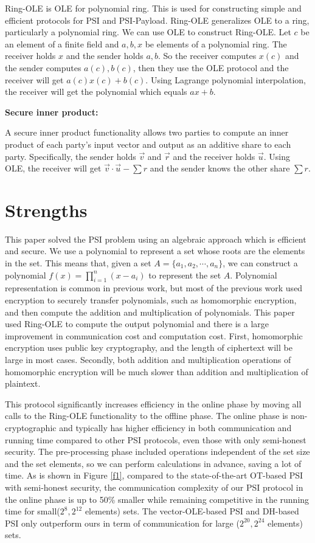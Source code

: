 \documentclass{source/Paper}
\begin{document}
    Ring-OLE is OLE for polynomial ring.
    This is used for constructing simple and efficient protocols for PSI and PSI-Payload. Ring-OLE generalizes OLE to a ring, particularly a polynomial ring. We can use OLE to construct Ring-OLE. Let $c$ be an element of a finite field and $a,b,x$ be elements of a polynomial ring.
    The receiver holds $x$ and the sender holds $a,b$. So the receiver computes $x(c)$ and the sender computes $a(c),b(c)$, then they use the OLE protocol and the receiver will get $a(c)x(c)+b(c)$. Using Lagrange polynomial interpolation, the receiver will get the polynomial which equals $ax+b$.

    \textbf{Secure inner product:}

    A secure inner product functionality allows two parties to compute an inner product of each party's input vector and output as an additive share to each party. Specifically, the sender holds $\vec{v}$ and $\vec{r}$ and the receiver holds $\vec{u}$. Using OLE, the receiver will get $\vec{v}\cdot \vec{u} - \sum r$ and the sender knows the other share $ \sum r$.



    \section{Strengths}

    This paper solved the PSI problem using an algebraic approach which is efficient and secure. We use a polynomial to represent a set whose roots are the elements in the set. This means that, given a set $A=\{ a_1,a_2,\cdots,a_n\}$, we can construct a polynomial $f(x)=\prod_{i=1}^{n}(x-a_i)$ to represent the set $A$. Polynomial representation is common in previous work, but most of the previous work used encryption to securely transfer polynomials, such as homomorphic encryption, and then compute the addition and multiplication of polynomials. This paper used Ring-OLE to compute the output polynomial and there is a large improvement in communication cost and computation cost. First, homomorphic encryption uses public key cryptography, and the length of ciphertext will be large in most cases. Secondly, both addition and multiplication operations of homomorphic encryption will be much slower than addition and multiplication of plaintext.

    This protocol significantly increases efficiency in the online phase by moving all calls to the Ring-OLE functionality to the offline phase. The online phase is non-cryptographic and typically has higher efficiency in both communication and running time compared to other PSI protocols, even those with only semi-honest security. The pre-processing phase included operations independent of the set size and the set elements, so we can perform calculations in advance, saving a lot of time. As is shown in Figure \ref{f1}, compared to the state-of-the-art OT-based PSI with semi-honest security, the communication complexity of our PSI protocol in the online phase is up to 50\% smaller while remaining competitive in the running time for small($2^{8},2^{12}$ elements) sets. The vector-OLE-based PSI and DH-based PSI only outperform ours in term of communication for large ($2^{20},2^{24}$ elements) sets.
\end{document}
